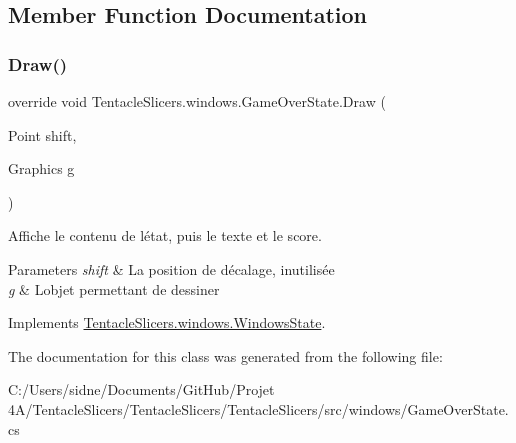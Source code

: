 \subsection{Member Function Documentation}
\mbox{\label{class_tentacle_slicers_1_1windows_1_1_game_over_state_ab2bdf6ae481b15e9a6c927cbd7e91756}} 
\subsubsection{\texorpdfstring{Draw()}{Draw()}}
{\footnotesize\ttfamily override void Tentacle\+Slicers.\+windows.\+Game\+Over\+State.\+Draw (\begin{DoxyParamCaption}\item[{Point}]{shift,  }\item[{Graphics}]{g }\end{DoxyParamCaption})\hspace{0.3cm}{\ttfamily [virtual]}}



Affiche le contenu de l\textquotesingle{}état, puis le texte et le score. 


\begin{DoxyParams}{Parameters}
{\em shift} & La position de décalage, inutilisée \\
\hline
{\em g} & L\textquotesingle{}objet permettant de dessiner \\
\hline
\end{DoxyParams}


Implements \hyperlink{class_tentacle_slicers_1_1windows_1_1_windows_state}{Tentacle\+Slicers.\+windows.\+Windows\+State}.



The documentation for this class was generated from the following file\+:\begin{DoxyCompactItemize}
\item 
C\+:/\+Users/sidne/\+Documents/\+Git\+Hub/\+Projet 4\+A/\+Tentacle\+Slicers/\+Tentacle\+Slicers/\+Tentacle\+Slicers/src/windows/Game\+Over\+State.\+cs\end{DoxyCompactItemize}
